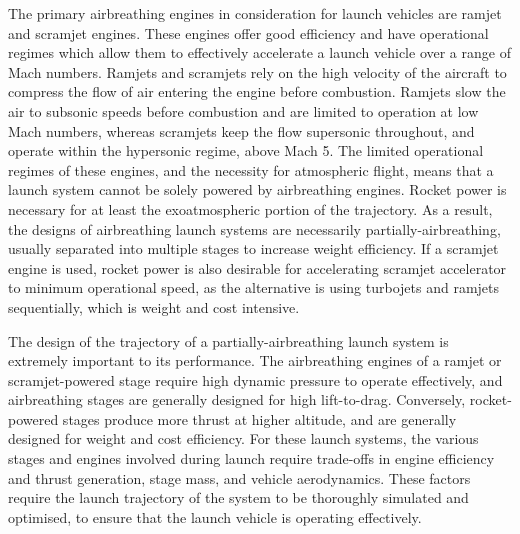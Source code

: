   	The primary airbreathing engines in consideration for launch vehicles are ramjet and scramjet engines\cite{HeiserWilliamPratt1994}. These engines offer good efficiency and have operational regimes which allow them to effectively accelerate a launch vehicle over a range of Mach numbers. 
  	Ramjets and scramjets rely on the high velocity of the aircraft to compress the flow of air entering the engine before combustion.  Ramjets slow the air to subsonic speeds before combustion and are limited to operation at low Mach numbers, whereas scramjets keep the flow supersonic throughout, and operate within the hypersonic regime, above Mach 5. 
  	The limited operational regimes of these engines, and the necessity for atmospheric flight, means that a launch system cannot be solely powered by airbreathing engines. Rocket power is necessary for at least the exoatmospheric portion of the trajectory. As a result, the designs of airbreathing launch systems are necessarily partially-airbreathing, usually separated into multiple stages to increase weight efficiency\cite{Smart2009a}. If a scramjet engine is used, rocket power is also desirable for accelerating scramjet accelerator to minimum operational speed, as the alternative is using turbojets and ramjets sequentially\cite{Smart2009a}, which is weight and cost intensive. 
  	
  	 
  	 The design of the trajectory of a partially-airbreathing launch system is extremely important to its performance. 
  	   The airbreathing engines of a ramjet or scramjet-powered stage require high dynamic pressure to operate effectively, and airbreathing stages are generally designed for high lift-to-drag. Conversely, rocket-powered stages produce more thrust at higher altitude, and are generally designed for weight and cost efficiency. For these launch systems, the various stages and engines involved during launch require trade-offs in engine efficiency and thrust generation, stage mass, and vehicle aerodynamics. These factors require the launch trajectory of the system to be thoroughly simulated and optimised, to ensure that the launch vehicle is operating effectively. 
 	  

